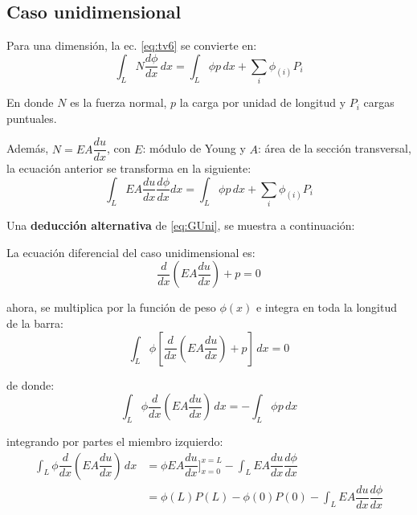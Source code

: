 \subsection{Caso unidimensional}

Para una dimensión, la ec. \eqref{eq:tv6} se convierte en:
\begin{equation}
	\int_L N \dfrac{d \phi}{dx} \, dx = \int_L \phi p \, dx + \sum_i \phi_{(i)} P_i
\end{equation}

En donde $N$ es la fuerza normal, $p$ la carga por unidad de longitud y $P_i$ cargas puntuales.

Además, $N = EA \dfrac{du}{dx}$, con $E$: módulo de Young y $A$: área de la sección transversal, la ecuación anterior se transforma en la siguiente:
\begin{equation}
	\boxed{\int_L EA \dfrac{du}{dx} \dfrac{d \phi}{dx} dx = \int_L \phi p \, dx + \sum_i \phi_{(i)} P_i}
	\label{eq:GUni}
\end{equation}

Una \textbf{deducción alternativa} de \eqref{eq:GUni}, se muestra a continuación:

La ecuación diferencial del caso unidimensional es:
\begin{equation}
	\dfrac{d}{dx} \left( EA \dfrac{du}{dx} \right) + p = 0
\end{equation}

ahora, se multiplica por la función de peso $\phi(x)$ e integra en toda la longitud de la barra:
\begin{equation}
	\int_L \phi \left[ \dfrac{d}{dx} \left( EA \dfrac{du}{dx} \right) + p \right] \, dx = 0
\end{equation}

de donde:
\begin{equation}
	\int_L \phi \dfrac{d}{dx} \left( EA \dfrac{du}{dx} \right) \, dx = -\int_L \phi p \, dx
	\label{eq:g1}
\end{equation}

integrando por partes el miembro izquierdo:
\begin{equation}
	\begin{split}
		\int_L \phi \dfrac{d}{dx} \left( EA \dfrac{du}{dx} \right) \, dx &= \phi EA \dfrac{du}{dx} \Big ]_{x=0}^{x=L} - \int_L EA \dfrac{du}{dx} \dfrac{d \phi}{dx} \\ & = \phi(L)P(L) - \phi(0)P(0) - \int_L EA \dfrac{du}{dx} \dfrac{d \phi}{dx}
	\end{split}
	\label{eq:partes}
\end{equation}


